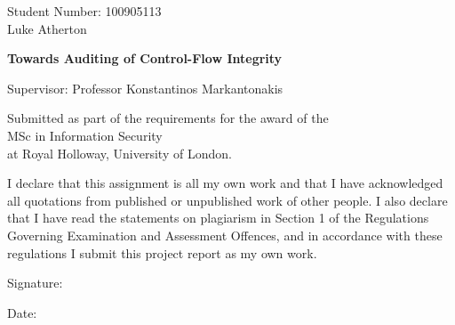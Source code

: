 \begin{titlepage}
    \begin{center}      
		\huge
		Student Number: 100905113\\
		Luke Atherton		
		        
        \vspace*{1cm}
        
        \Huge
        \textbf{Towards Auditing of Control-Flow Integrity}
 
        \vspace{0.5cm}
        \LARGE
        Supervisor: Professor Konstantinos Markantonakis
 
        \vspace{1cm}
 
        \vfill
        
 		\large
        Submitted as part of the requirements for the award of the\\
        MSc in Information Security\\
        at Royal Holloway, University of London.
 
		\vspace{1cm}
 
        \vfill 
 
        \Large
        
        \date{\today}
        
 
    \end{center}
    \normalsize

\noindent
I declare that this assignment is all my own work and that I have acknowledged all quotations from published or unpublished work of other people.  I also declare that I have read the statements on plagiarism in Section 1 of the Regulations Governing Examination and Assessment Offences, and in accordance with these regulations I submit this project report as my own work.

\noindent
Signature:
			
\noindent
Date:
\end{titlepage}